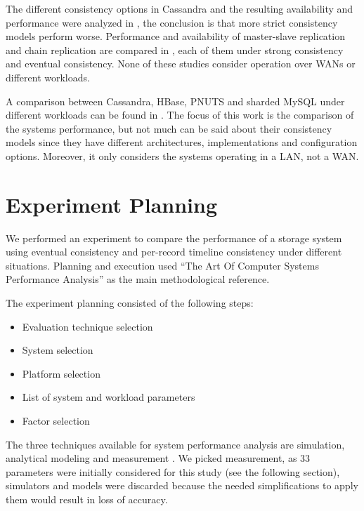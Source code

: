\documentclass[man,floatsintext,12pt]{apa6}
\begin{document}
The different consistency options in Cassandra and the resulting availability
and performance were analyzed in \parencite{Beyer2011}, the conclusion is that
more strict consistency models perform worse. Performance and availability of
master-slave replication and chain replication are compared in
\parencite{vanRenesse2004}, each of them under strong consistency and eventual
consistency. None of these studies consider operation over WANs or different
workloads.

A comparison between Cassandra, HBase, PNUTS and sharded MySQL under different
workloads can be found in \parencite{Cooper2010}. The focus of this work is the
comparison of the systems performance, but not much can be said about their
consistency models since they have different architectures, implementations and
configuration options. Moreover, it only considers the systems operating in a
LAN, not a WAN.

\section{Experiment Planning}

We performed an experiment to compare the performance of a storage system using
eventual consistency and per-record timeline consistency under different
situations. Planning and execution used ``The Art Of Computer Systems
Performance Analysis'' \parencite{Jain1991} as the main methodological reference.

The experiment planning consisted of the following steps:

\begin{itemize}
\item Evaluation technique selection
\item System selection
\item Platform selection
\item List of system and workload parameters
\item Factor selection
\end{itemize}

The three techniques available for system performance analysis are simulation,
analytical modeling and measurement \parencite{Jain1991}. We picked measurement, as
33 parameters were initially considered for this study (see the following
section), simulators and models were discarded because the needed
simplifications to apply them would result in loss of accuracy.
\end{document}

